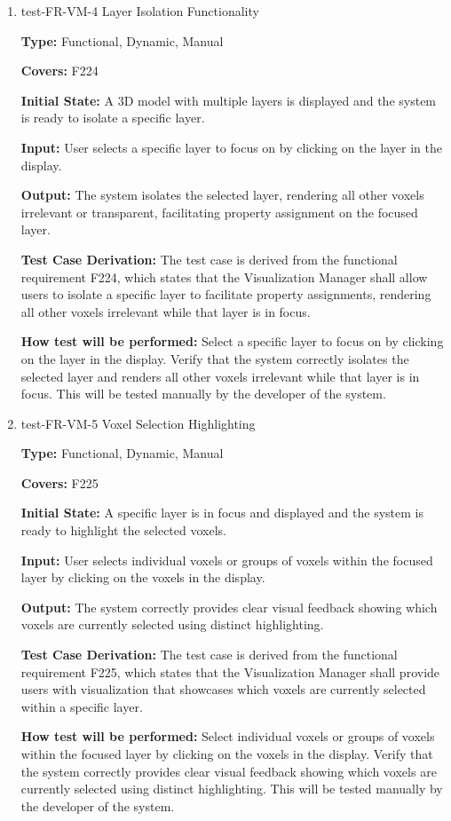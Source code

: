 \documentclass[12pt, titlepage]{article}
\begin{document}
\begin{enumerate}

\item{test-FR-VM-4 Layer Isolation Functionality\\}

\textbf{Type:} Functional, Dynamic, Manual

\textbf{Covers:} F224
					
\textbf{Initial State:} A 3D model with multiple layers is displayed and the system is ready to isolate a specific layer.
					
\textbf{Input:} User selects a specific layer to focus on by clicking on the layer in the display.
					
\textbf{Output:} The system isolates the selected layer, rendering all other voxels irrelevant or transparent, facilitating property assignment on the focused layer.

\textbf{Test Case Derivation:} The test case is derived from the functional requirement F224, which states that the Visualization Manager shall allow users to isolate a specific layer to facilitate property assignments, rendering all other voxels irrelevant while that layer is in focus.
					
\textbf{How test will be performed:} Select a specific layer to focus on by clicking on the layer in the display. Verify that the system correctly isolates the selected layer and renders all other voxels irrelevant while that layer is in focus. This will be tested manually by the developer of the system.

\item{test-FR-VM-5 Voxel Selection Highlighting\\}

\textbf{Type:} Functional, Dynamic, Manual

\textbf{Covers:} F225
					
\textbf{Initial State:} A specific layer is in focus and displayed and the system is ready to highlight the selected voxels.
					
\textbf{Input:} User selects individual voxels or groups of voxels within the focused layer by clicking on the voxels in the display.
					
\textbf{Output:} The system correctly provides clear visual feedback showing which voxels are currently selected using distinct highlighting.

\textbf{Test Case Derivation:} The test case is derived from the functional requirement F225, which states that the Visualization Manager shall provide users with visualization that showcases which voxels are currently selected within a specific layer.
					
\textbf{How test will be performed:} Select individual voxels or groups of voxels within the focused layer by clicking on the voxels in the display. Verify that the system correctly provides clear visual feedback showing which voxels are currently selected using distinct highlighting. This will be tested manually by the developer of the system.

\end{enumerate}
\end{document}
